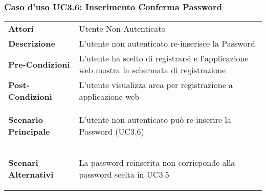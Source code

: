 \subsubsection{Caso d'uso UC3.6:  Inserimento Conferma Password}
\label{UC3_6}

\begin{longtable}{ l | p{11cm}}
	\hline
	\rowcolor{Gray}
	 \multicolumn{2}{c}{UC3.6 - Inserimento Conferma Password} \\
	 \hline
	\textbf{Attori} & Utente Non Autenticato \\
	\textbf{Descrizione} & L'utente non autenticato re-inserisce la Password   \\
	\textbf{Pre-Condizioni} & L'utente ha scelto di registrarsi e l'applicazione web mostra la schermata di registrazione \\
	\textbf{Post-Condizioni} & L'utente visualizza area per registrazione a applicazione web \\
	\textbf{Scenario Principale} & \begin{enumerate*}[label=(\arabic*.),itemjoin={\newline}]
		\item L'utente non autenticato può re-inserire la Password (UC3.6)
	\end{enumerate*}\\
	\textbf{Scenari Alternativi} & 
	\begin{enumerate*}[label=(\arabic*.),itemjoin={\newline}]
		\item La password reinserita non corrisponde alla password scelta in UC3.5 
	\end{enumerate*}\\
\end{longtable}
